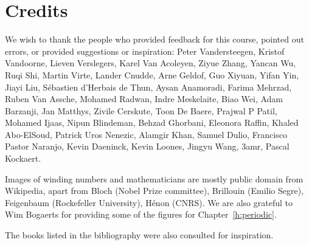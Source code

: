 \chapter{Credits}
\label{h:credits}

We wish to thank the people who provided feedback for this course, pointed out errors, or provided suggestions or inspiration: Peter Vandersteegen, Kristof Vandoorne, Lieven Verslegers, Karel Van Acoleyen, Ziyue Zhang, Yancan Wu, Ruqi Shi, Martin Virte, Lander Cnudde, Arne Geldof, Guo Xiyuan, Yifan Yin, Jiayi Liu, S\'ebastien d’Herbais de Thun, Aysan Anamoradi, Farima Mehrzad, Ruben Van Assche, Mohamed Radwan, Indre Meskelaite, Biao Wei, Adam Barzanji, Jan Matthys, Zivile Cerskute, Toon De Baere, Prajwal P Patil, Mohamed Ijaas, Nipun Blindeman, Behzad Ghorbani, Eleonora Raffin, Khaled Abo-ElSoud, Patrick Uros Nenezic, Alamgir Khan, Samuel Dulio, Francisco Pastor Naranjo, Kevin Daeninck, Kevin Loones, Jingyu Wang, 3amr, Pascal Kockaert.

Images of winding numbers and mathematicians are mostly public domain from Wikipedia, apart from Bloch (Nobel Prize committee), Brillouin (Emilio Segre), Feigenbaum (Rockefeller University), H\'{e}non (CNRS). We are also grateful to Wim Bogaerts for providing some of the figures for Chapter~\ref{h:periodic}.

The books listed in the bibliography were also consulted for inspiration.

